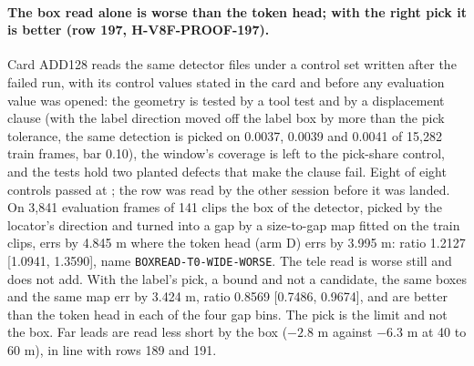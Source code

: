 \paragraph{The box read alone is worse than the token head; with the right pick it is better (row 197, H-V8F-PROOF-197).} Card ADD128 reads the same detector files under a control set written after the failed run, with its control values stated in the card and before any evaluation value was opened: the geometry is tested by a tool test and by a displacement clause (with the label direction moved off the label box by more than the pick tolerance, the same detection is picked on 0.0037, 0.0039 and 0.0041 of 15,282 train frames, bar 0.10), the window's coverage is left to the pick-share control, and the tests hold two planted defects that make the clause fail. Eight of eight controls passed at ; the row was read by the other session before it was landed. On 3,841 evaluation frames of 141 clips the box of the detector, picked by the locator's direction and turned into a gap by a size-to-gap map fitted on the train clips, errs by 4.845 m where the token head (arm D) errs by 3.995 m: ratio 1.2127 [1.0941, 1.3590], name \texttt{BOXREAD-T0-WIDE-WORSE}. The tele read is worse still and does not add. With the label's pick, a bound and not a candidate, the same boxes and the same map err by 3.424 m, ratio 0.8569 [0.7486, 0.9674], and are better than the token head in each of the four gap bins. The pick is the limit and not the box. Far leads are read less short by the box ($-2.8$ m against $-6.3$ m at 40 to 60 m), in line with rows 189 and 191.
